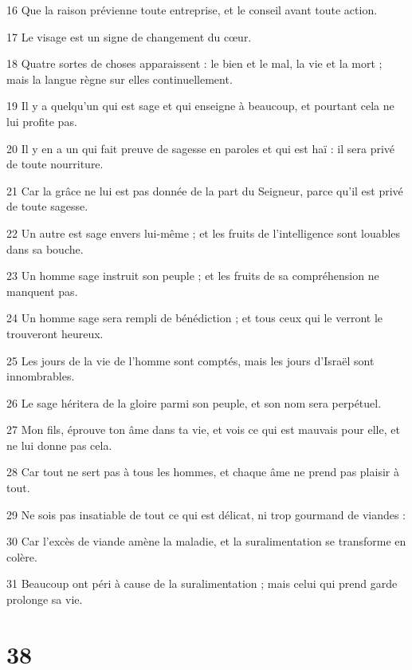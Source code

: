 \par 16 Que la raison prévienne toute entreprise, et le conseil avant toute action.
\par 17 Le visage est un signe de changement du cœur.
\par 18 Quatre sortes de choses apparaissent : le bien et le mal, la vie et la mort ; mais la langue règne sur elles continuellement.
\par 19 Il y a quelqu'un qui est sage et qui enseigne à beaucoup, et pourtant cela ne lui profite pas.
\par 20 Il y en a un qui fait preuve de sagesse en paroles et qui est haï : il sera privé de toute nourriture.
\par 21 Car la grâce ne lui est pas donnée de la part du Seigneur, parce qu'il est privé de toute sagesse.
\par 22 Un autre est sage envers lui-même ; et les fruits de l'intelligence sont louables dans sa bouche.
\par 23 Un homme sage instruit son peuple ; et les fruits de sa compréhension ne manquent pas.
\par 24 Un homme sage sera rempli de bénédiction ; et tous ceux qui le verront le trouveront heureux.
\par 25 Les jours de la vie de l'homme sont comptés, mais les jours d'Israël sont innombrables.
\par 26 Le sage héritera de la gloire parmi son peuple, et son nom sera perpétuel.
\par 27 Mon fils, éprouve ton âme dans ta vie, et vois ce qui est mauvais pour elle, et ne lui donne pas cela.
\par 28 Car tout ne sert pas à tous les hommes, et chaque âme ne prend pas plaisir à tout.
\par 29 Ne sois pas insatiable de tout ce qui est délicat, ni trop gourmand de viandes :
\par 30 Car l'excès de viande amène la maladie, et la suralimentation se transforme en colère.
\par 31 Beaucoup ont péri à cause de la suralimentation ; mais celui qui prend garde prolonge sa vie.

\chapter{38}

